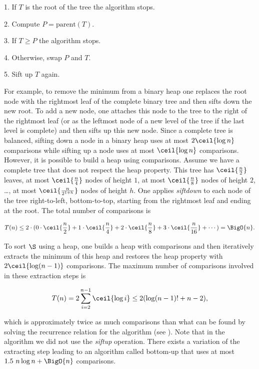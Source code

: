 \begin{algorithm}
\item[1.] If \(T\) is the root of the tree the algorithm stops.
\item[2.] Compute \(P = \text{parent}(T)\).
\item[3.] If \(T \ge P\) the algorithm stops.
\item[4.] Otherwise, swap \(P\) and \(T\).
\item[5.] Sift up \(T\) again.
\end{algorithm}

For example, to remove the minimum from a binary heap one replaces the root
node with the rightmost leaf of the complete binary tree and then sifts down
the new root. To add a new node, one attaches this node to the tree to the
right of the rightmost leaf (or as the leftmost node of a new level
of the tree if the last level is complete) and then sifts up this new node.
Since a complete tree is balanced, sifting down a node in a binary heap uses
at most \(2 \ceil{\log n}\) comparisons while sifting up a node uses at most
\(\ceil{\log n}\)
comparisons. However, it is possible to build a heap using 
comparisons. Assume we have a complete tree that does not respect the heap
property. This tree has \(\ceil{\frac{n}{2}}\) leaves, at most
\(\ceil{\frac{n}{4}}\) nodes of height \(1\), at most \(\ceil{\frac{n}{8}}\)
nodes of height \(2\), \dots, \ie at most \(\ceil{\frac{n}{2^{1+h}}}\) nodes
of height \(h\).
One applies \emph{siftdown} to each node of the tree right-to-left,
bottom-to-top, starting from the rightmost leaf and ending at the root. The
total number of comparisons is

\begin{displaymath}
T(n) \le 2 \cdot ( 0 \cdot \ceil{\frac{n}{2}} + 1 \cdot \ceil{\frac{n}{4}} + 2 \cdot
\ceil{\frac{n}{8}} + 3 \cdot \ceil{\frac{n}{16}} + \cdots ) = \BigO{n}.
\end{displaymath}

To sort \(\S\) using a heap, one builds a heap with  comparisons and
then iteratively extracts the minimum of this heap and restores the heap
property with \(2\ceil{\log (n-1)}\) comparisons. The maximum number of
comparisons involved in these extraction steps is

\begin{displaymath}
T(n) = 2 \sum_{i=2}^{n-1} \ceil{\log i} \le 2 ( \log (n-1)! + n - 2 ),
\end{displaymath}

which is approximately twice as much comparisons than what can be found by
solving the recurrence relation for the \mergesort algorithm (see
\citet*{OEIS:A001855}). Note that in the \heapsort algorithm we did not use the
\emph{siftup} operation. There exists \cite{wegener:1993} a variation of the
extracting step leading to an algorithm called bottom-up \heapsort that uses at
most \(1.5~n \log n + \BigO{n}\) comparisons.

